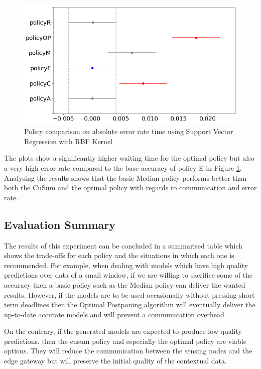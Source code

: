 \documentclass{mpaper}
\begin{document}
\begin{figure}[h]
    \centering
    \includegraphics[scale=0.35]{imgs/svr_rbf_R5_error_plot_diff_means.png}
    \caption{Policy comparison on absolute error rate time using Support Vector Regression with RBF Kernel}
    \label{fig:svr_rbf_R5_error_plot_diff_means}
\end{figure}

The plots show a significantly higher waiting time for the optimal policy but also a very high error rate compared to the base accuracy of policy E in Figure \ref{fig:svr_rbf_R5_error_plot_diff_means}. Analysing the results shows that the basic Median policy performs better than both the CuSum and the optimal policy with regards to communication and error rate.
\newpage
\subsection{Evaluation Summary}
The results of this experiment can be concluded in a summarised table which shows the trade-offs for each policy and the situations in which each one is recommended. 
For example, when dealing with models which have high quality predictions over data of a small window, if we are willing to sacrifice some of the accuracy then a basic policy such as the Median policy can deliver the wanted results. However, if the models are to be used occasionally without pressing short term deadlines then the Optimal Postponing algorithm will eventually deliver the up-to-date accurate models and will prevent a communication overhead.

On the contrary, if the generated models are expected to produce low quality predictions, then the cusum policy and especially the optimal policy are viable options. They will reduce the communication between the sensing nodes and the edge gateway but will preserve the initial quality of the contextual data.
\end{document}
